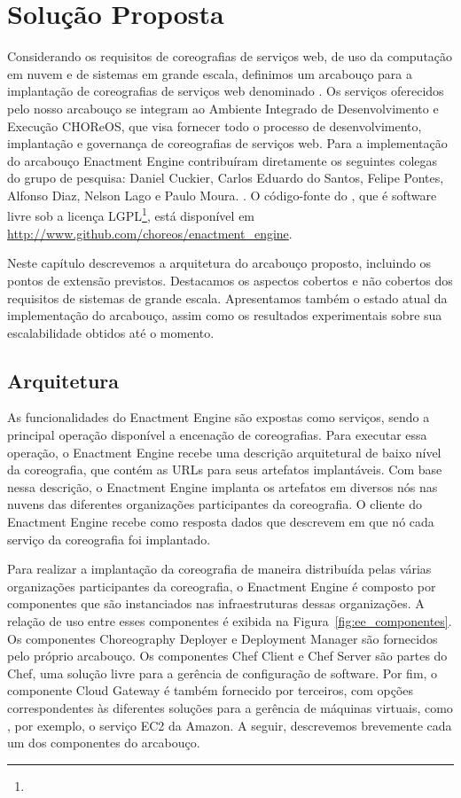 
\chapter{Solução Proposta}
\label{cap:solucao}

Considerando os requisitos de coreografias de serviços web, de uso da computação em nuvem e de sistemas em grande escala, definimos um arcabouço para a implantação de coreografias de serviços web denominado \ee. Os serviços oferecidos pelo nosso arcabouço se integram ao Ambiente Integrado de Desenvolvimento e Execução CHOReOS, que visa fornecer todo o processo de desenvolvimento, implantação e governança de coreografias de serviços web. Para a implementação do arcabouço Enactment Engine contribuíram diretamente os seguintes colegas do grupo de pesquisa: Daniel Cuckier, Carlos Eduardo do Santos, Felipe Pontes, Alfonso Diaz, Nelson Lago e Paulo Moura. . O código-fonte do \ee, que é software livre sob a licença LGPL\footnote{}, está disponível em \url{http://www.github.com/choreos/enactment\_engine}.

Neste capítulo descrevemos a arquitetura do arcabouço proposto, incluindo os pontos de extensão previstos. Destacamos os aspectos cobertos e não cobertos dos requisitos de sistemas de grande escala. Apresentamos também o estado atual da implementação do arcabouço, assim como os resultados experimentais sobre sua escalabilidade obtidos até o momento.

\section{Arquitetura}
\label{sec:arquitetura}

As funcionalidades do Enactment Engine são expostas como serviços, sendo a principal operação disponível a encenação de coreografias. Para executar essa operação, o Enactment Engine recebe uma descrição arquitetural de baixo nível da coreografia, que contém as URLs para seus artefatos implantáveis. Com base nessa descrição, o Enactment Engine implanta os artefatos em diversos nós nas nuvens das diferentes organizações participantes da coreografia. O cliente do Enactment Engine recebe como resposta dados que descrevem em que nó cada serviço da coreografia foi implantado.

Para realizar a implantação da coreografia de maneira distribuída pelas várias organizações participantes da coreografia, o Enactment Engine é composto por  componentes que são instanciados nas infraestruturas dessas organizações. A relação de uso entre esses componentes é exibida na Figura~\ref{fig:ee_componentes}. Os componentes Choreography Deployer e Deployment Manager são fornecidos pelo próprio arcabouço. Os componentes Chef Client e Chef Server são partes do Chef, uma solução livre para a gerência de configuração de software. Por fim, o componente Cloud Gateway é também fornecido por terceiros, com opções correspondentes às diferentes soluções para a gerência de máquinas virtuais, como , por exemplo, o serviço EC2 da Amazon. A seguir, descrevemos brevemente cada um dos componentes do arcabouço.

